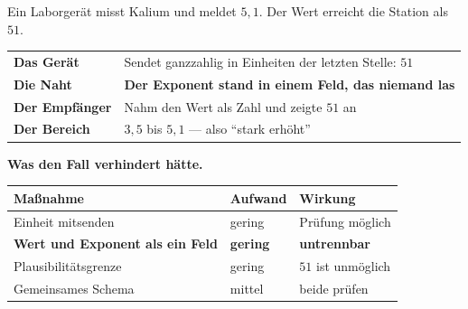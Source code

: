 \begin{geschichte}
Ein Laborgerät misst Kalium und meldet $5{,}1$. Der Wert erreicht die Station als $51$.

\begin{center}
\renewcommand{\arraystretch}{1.5}
\begin{tabular}{@{}P{2.6cm}P{6.2cm}@{}}
\toprule
\textbf{Das Gerät} & Sendet ganzzahlig in Einheiten der letzten Stelle: $51$\\
\textbf{Die Naht} & \textbf{Der Exponent stand in einem Feld, das niemand las}\\
\textbf{Der Empfänger} & Nahm den Wert als Zahl und zeigte $51$ an\\
\textbf{Der Bereich} & $3{,}5$ bis $5{,}1$ --- also \enquote{stark erhöht}\\
\bottomrule
\end{tabular}
\end{center}

\begin{center}
\begin{minipage}{0.86\textwidth}
\end{minipage}
\end{center}

\textbf{Was den Fall verhindert hätte.}

\begin{center}
{\small
\renewcommand{\arraystretch}{1.45}
\begin{tabular}{@{}P{3.0cm}P{2.4cm}P{2.6cm}@{}}
\toprule
\textbf{Maßnahme} & \textbf{Aufwand} & \textbf{Wirkung}\\
\midrule
Einheit mitsenden & \textcolor{gruen}{gering} & \textcolor{gruen}{Prüfung möglich}\\
\textbf{Wert und Exponent als ein Feld} & \textcolor{gruen}{\textbf{gering}} & \textcolor{gruen}{\textbf{untrennbar}}\\
Plausibilitätsgrenze & \textcolor{gruen}{gering} & \textcolor{gruen}{$51$ ist unmöglich}\\
Gemeinsames Schema & mittel & \textcolor{gruen}{beide prüfen}\\
\bottomrule
\end{tabular}}
\end{center}

\begin{center}
\begin{minipage}{0.86\textwidth}
\end{minipage}
\end{center}


\end{geschichte}
